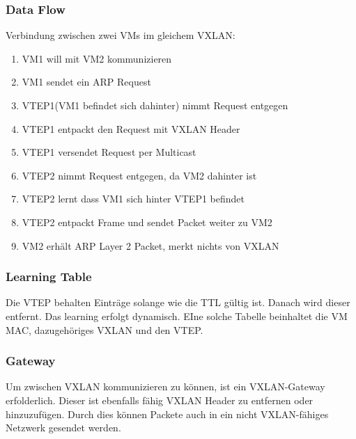\documentclass[a4,12pt]{scrartcl}
\begin{document}
\subsubsection{Data Flow}
Verbindung zwischen zwei VMs im gleichem VXLAN: 
\begin{enumerate}
\item VM1 will mit VM2 kommunizieren 
\item VM1 sendet ein ARP Request 
\item VTEP1(VM1 befindet sich dahinter) nimmt Request entgegen 
\item VTEP1 entpackt den Request mit VXLAN Header 
\item VTEP1 versendet Request per Multicast 
\item VTEP2 nimmt Request entgegen, da VM2 dahinter ist 
\item VTEP2 lernt dass VM1 sich hinter VTEP1 befindet 
\item VTEP2 entpackt Frame und sendet Packet weiter zu VM2
\item VM2 erhält ARP Layer 2 Packet, merkt nichts von VXLAN
\end{enumerate}

\subsubsection{Learning Table}
Die VTEP behalten Einträge solange wie die TTL gültig ist. Danach wird dieser entfernt. Das learning erfolgt dynamisch. EIne solche Tabelle beinhaltet die VM MAC, dazugehöriges VXLAN und den VTEP. 

\subsubsection{Gateway}
Um zwischen VXLAN kommunizieren zu können, ist ein VXLAN-Gateway erfolderlich. Dieser ist ebenfalls fähig VXLAN Header zu entfernen oder hinzuzufügen. Durch dies können Packete auch in ein nicht VXLAN-fähiges Netzwerk gesendet werden. 
\end{document}
